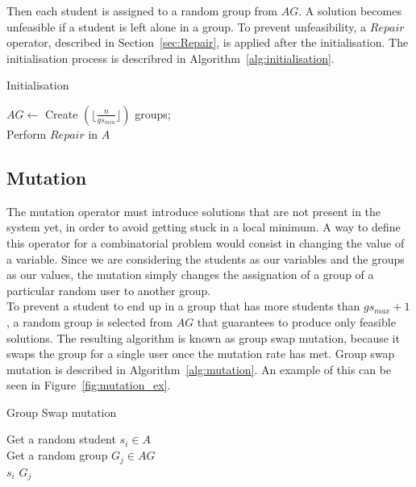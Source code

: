 Then each student is assigned to a random group from $AG$.
A solution becomes unfeasible if a student is left alone in a group.
To prevent unfeasibility, %
a $Repair$ operator, described in Section~\ref{sec:Repair}, is applied after the initialisation. The initialisation process is describred in Algorithm~\ref{alg:initialisation}.\\

\begin{algorithm}[H]
\caption{Initialisation}
\label{alg:initialisation}
\SetAlgoLined 
$AG \leftarrow$ Create $(\lfloor\frac{n}{gs_{min}}\rfloor)$ groups;\\
Perform $Repair$ in $A$
\end{algorithm}

\subsection{Mutation}

The mutation operator %
must introduce solutions that are not present in the system yet, in order to avoid getting stuck in a local minimum. A way to define this operator for a combinatorial problem would consist in changing the  value of a variable. Since we are considering the students as our variables and the groups as our values, the mutation simply changes the assignation of a group of a particular random user to another group.\\

To prevent a student to end up in a group that has more students than $gs_{max} + 1$, a random group is selected from $AG$ that guarantees to produce only feasible solutions. The resulting algorithm is known as group swap mutation, because it swaps the group for a single user once the mutation rate has met. Group swap mutation is described in Algorithm~\ref{alg:mutation}. An example of this can be seen in Figure~\ref{fig:mutation_ex}.

\begin{algorithm}[H]
    \caption{Group Swap mutation}
    \label{alg:mutation}
    \SetAlgoLined 
    Get a random student $s_i \in A$\;\\
    Get a random group $G_j \in AG$\;\\
    $s_i$ \gets $G_j$ 
\end{algorithm}

